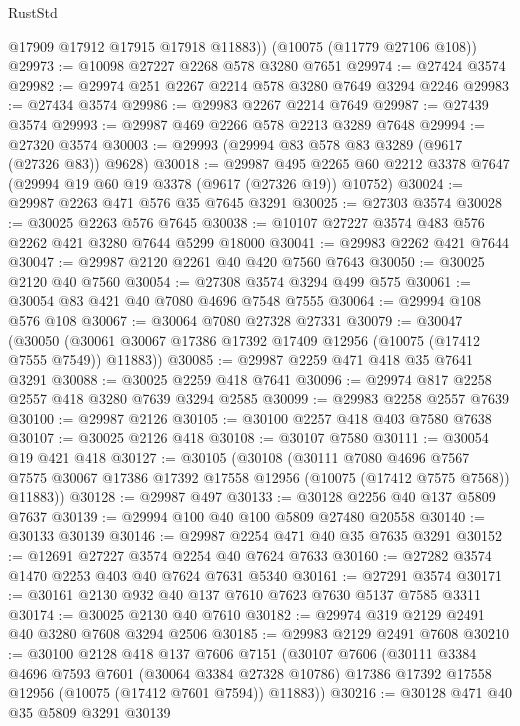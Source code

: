 \begin{lexlean}{RustStd}
\begin{coremodule}
        @17909
        @17912
        @17915
        @17918
        @11883))
    (@10075 (@11779 @27106 @108))
@29973 := @10098 @27227 @2268 @578 @3280 @7651
@29974 := @27424 @3574
@29982 := @29974 @251 @2267 @2214 @578 @3280 @7649 @3294 @2246
@29983 := @27434 @3574
@29986 := @29983 @2267 @2214 @7649
@29987 := @27439 @3574
@29993 := @29987 @469 @2266 @578 @2213 @3289 @7648
@29994 := @27320 @3574
@30003 := @29993 (@29994 @83 @578 @83 @3289 (@9617 (@27326 @83)) @9628)
@30018 := @29987
    @495
    @2265
    @60
    @2212
    @3378
    @7647
    (@29994 @19 @60 @19 @3378 (@9617 (@27326 @19)) @10752)
@30024 := @29987 @2263 @471 @576 @35 @7645 @3291
@30025 := @27303 @3574
@30028 := @30025 @2263 @576 @7645
@30038 := @10107 @27227 @3574 @483 @576 @2262 @421 @3280 @7644 @5299 @18000
@30041 := @29983 @2262 @421 @7644
@30047 := @29987 @2120 @2261 @40 @420 @7560 @7643
@30050 := @30025 @2120 @40 @7560
@30054 := @27308 @3574 @3294 @499 @575
@30061 := @30054 @83 @421 @40 @7080 @4696 @7548 @7555
@30064 := @29994 @108 @576 @108
@30067 := @30064 @7080 @27328 @27331
@30079 := @30047
    (@30050 (@30061 @30067 @17386 @17392 @17409 @12956 (@10075 (@17412 @7555 @7549)) @11883))
@30085 := @29987 @2259 @471 @418 @35 @7641 @3291
@30088 := @30025 @2259 @418 @7641
@30096 := @29974 @817 @2258 @2557 @418 @3280 @7639 @3294 @2585
@30099 := @29983 @2258 @2557 @7639
@30100 := @29987 @2126
@30105 := @30100 @2257 @418 @403 @7580 @7638
@30107 := @30025 @2126 @418
@30108 := @30107 @7580
@30111 := @30054 @19 @421 @418
@30127 := @30105
    (@30108
      (@30111
        @7080
        @4696
        @7567
        @7575
        @30067
        @17386
        @17392
        @17558
        @12956
        (@10075 (@17412 @7575 @7568))
        @11883))
@30128 := @29987 @497
@30133 := @30128 @2256 @40 @137 @5809 @7637
@30139 := @29994 @100 @40 @100 @5809 @27480 @20558
@30140 := @30133 @30139
@30146 := @29987 @2254 @471 @40 @35 @7635 @3291
@30152 := @12691 @27227 @3574 @2254 @40 @7624 @7633
@30160 := @27282 @3574 @1470 @2253 @403 @40 @7624 @7631 @5340
@30161 := @27291 @3574
@30171 := @30161 @2130 @932 @40 @137 @7610 @7623 @7630 @5137 @7585 @3311
@30174 := @30025 @2130 @40 @7610
@30182 := @29974 @319 @2129 @2491 @40 @3280 @7608 @3294 @2506
@30185 := @29983 @2129 @2491 @7608
@30210 := @30100
    @2128
    @418
    @137
    @7606
    @7151
    (@30107
      @7606
      (@30111
        @3384
        @4696
        @7593
        @7601
        (@30064 @3384 @27328 @10786)
        @17386
        @17392
        @17558
        @12956
        (@10075 (@17412 @7601 @7594))
        @11883))
@30216 := @30128 @471 @40 @35 @5809 @3291 @30139

\end{coremodule}
\end{lexlean}
